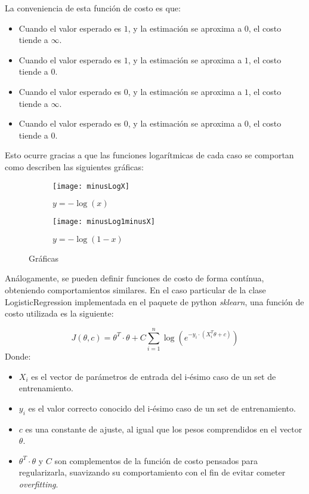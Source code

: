 La conveniencia de esta función de costo es que:

\begin{itemize}
  \item Cuando el valor esperado es $1$, y la estimación se aproxima a $0$, el costo tiende a $\infty$.
  \item Cuando el valor esperado es $1$, y la estimación se aproxima a $1$, el costo tiende a $0$.
  \item Cuando el valor esperado es $0$, y la estimación se aproxima a $1$, el costo tiende a $\infty$.
  \item Cuando el valor esperado es $0$, y la estimación se aproxima a $0$, el costo tiende a $0$.
\end{itemize}

Esto ocurre gracias a que las funciones logarítmicas de cada caso se comportan como describen las siguientes gráficas:

\begin{figure}[H]
\centering
\begin{subfigure}{.5\textwidth}
  \centering
  \texttt{[image: minusLogX]}
  \caption{$y = - \log (x)$}
  \label{fig:minusLogX}
\end{subfigure}%
\begin{subfigure}{.34\textwidth}
  \centering
  \texttt{[image: minusLog1minusX]}
  \caption{$y = - \log (1-x)$}
  \label{fig:minusLog1minusX}
\end{subfigure}
\caption{Gráficas}
\label{fig:minusLog}
\end{figure}

Análogamente, se pueden definir funciones de costo de forma contínua, obteniendo comportamientos similares. En el caso particular de la clase LogisticRegression implementada en el paquete de python \textit{sklearn}, una función de costo utilizada es la siguiente:

\begin{equation}
J(\theta,c)= \theta^T \cdot \theta + C \sum_{i=1}^n \log (e^{-y_{i} \cdot (X_{i}^T \theta + c)})
\end{equation}
Donde:

\begin{itemize}
  \item $X_{i}$ es el vector de parámetros de entrada del i-ésimo caso de un set de entrenamiento.
  \item $y_{i}$ es el valor correcto conocido del i-ésimo caso de un set de entrenamiento.
  \item $c$ es una constante de ajuste, al igual que los pesos comprendidos en el vector $\theta$.
  \item $\theta^T \cdot \theta$ y $C$ son complementos de la función de costo pensados para regularizarla, suavizando su comportamiento con el fin de evitar cometer \textit{overfitting}.
\end{itemize}

